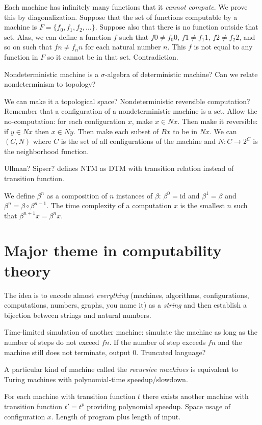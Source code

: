 Each machine has infinitely many functions that it \emph{cannot compute}.
We prove this by diagonalization.
Suppose that the set of functions computable by a machine is $F = \{ f_0, f_1, f_2, \ldots \}$.
Suppose also that there is no function outside that set.
Alas, we can define a function $f$
such that $f0 \neq f_0 0$, $f1 \neq f_1 1$, $f2 \neq f_2 2$, and so on
such that $fn \neq f_n n$ for each natural number $n$.
This $f$ is not equal to any function in $F$ so it cannot be in that set.
Contradiction.

Nondeterministic machine is a $\sigma$-algebra of deterministic machine?
Can we relate nondeterminism to topology?

We can make it a topological space?
Nondeterministic reversible computation?
Remember that a configuration of a nondeterministic machine is a set.
Allow the no-computation: for each configuration $x$, make $x \in N x$.
Then make it reversible:
if $y \in N x$ then $x \in N y$.
Then make each subset of $B x$ to be in $N x$.
We can $(C,N)$ where $C$ is the set of all configurations of the machine
and $N : C \to 2^C$ is the neighborhood function.

Ullman? Sipser? defines NTM as DTM with transition relation instead of transition function.

We define $\beta^n$ as a composition of $n$ instances of $\beta$:
$\beta^0 = \text{id}$ and $\beta^1 = \beta$ and $\beta^n = \beta \circ \beta^{n-1}$.
The time complexity of a computation $x$
is the smallest $n$ such that $\beta^{n+1} x = \beta^n x$.

\section{Major theme in computability theory}

The idea is to encode almost \emph{everything}
(machines, algorithms, configurations, computations, numbers, graphs, you name it)
as a \emph{string} and then establish a bijection between strings and natural numbers.

Time-limited simulation of another machine:
simulate the machine as long as the number of steps do not exceed $f n$.
If the number of step exceeds $f n$ and the machine still does not terminate,
output $0$.
Truncated language?

A particular kind of machine called the \emph{recursive machines}
is equivalent to Turing machines with polynomial-time speedup/slowdown.

For each machine with transition function $t$ there exists another machine
with transition function $t' = t^p$
providing polynomial speedup.
Space usage of configuration $x$.
Length of program plus length of input.

